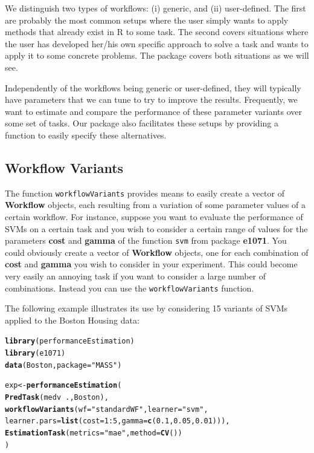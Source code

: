 \documentclass[10pt,a4paper]{article}\usepackage[]{graphicx}\usepackage[]{color}
\makeatletter
\newcommand{\hlnum}[1]{\textcolor[rgb]{0.686,0.059,0.569}{#1}}%
\newcommand{\hlstr}[1]{\textcolor[rgb]{0.192,0.494,0.8}{#1}}%
\newcommand{\hlopt}[1]{\textcolor[rgb]{0,0,0}{#1}}%
\newcommand{\hlstd}[1]{\textcolor[rgb]{0.345,0.345,0.345}{#1}}%
\newcommand{\hlkwb}[1]{\textcolor[rgb]{0.69,0.353,0.396}{#1}}%
\newcommand{\hlkwc}[1]{\textcolor[rgb]{0.333,0.667,0.333}{#1}}%
\newcommand{\hlkwd}[1]{\textcolor[rgb]{0.737,0.353,0.396}{\textbf{#1}}}%
\newenvironment{kframe}{%
 \def\at@end@of@kframe{}%
 \ifinner\ifhmode%
  \def\at@end@of@kframe{\end{minipage}}%
  \begin{minipage}{\columnwidth}%
 \fi\fi%
 \def\FrameCommand##1{\hskip\@totalleftmargin \hskip-\fboxsep
 \colorbox{shadecolor}{##1}\hskip-\fboxsep
     \hskip-\linewidth \hskip-\@totalleftmargin \hskip\columnwidth}%
 \MakeFramed {\advance\hsize-\width
   \@totalleftmargin\z@ \linewidth\hsize
   \@setminipage}}%
 {\par\unskip\endMakeFramed%
 \at@end@of@kframe}
\newenvironment{knitrout}{}{} %
\makeatother
\begin{document}
We distinguish two types of workflows: (i) generic, and (ii) user-defined. The first are probably the most common setups where the user simply wants to apply methods that already exist in R to some task. The second covers situations where the user has developed her/his own specific approach to solve a task and wants to apply it to some concrete problems. The package covers both situations as we will see.

Independently of the workflows being generic or user-defined, they will typically have parameters that we can tune to try to improve the results. Frequently, we want to estimate and compare the performance of these parameter variants over some set of tasks. Our package also facilitates these setups by providing a function to easily specify these alternatives.

\subsection{Workflow Variants}\label{sec:variants}

The function \texttt{workflowVariants}  provides  means to easily create a vector of \textbf{Workflow} objects, each resulting from a variation of some parameter values of a certain workflow. For instance, suppose you want to evaluate the performance of SVMs on a certain task and you wish to consider a certain range of values for the parameters \textbf{cost} and \textbf{gamma} of the function \texttt{svm} from package \textbf{e1071}. You could obviously create a vector of \textbf{Workflow} objects, one for each combination of \textbf{cost} and \textbf{gamma} you wish to consider in your experiment. This could become very easily an annoying task if you want to consider a large number of combinations. Instead you can use the \texttt{workflowVariants} function.

The following example illustrates its use by considering 15 variants of SVMs applied to the Boston Housing data:


\begin{knitrout}\footnotesize
{}\color{fgcolor}\begin{kframe}
\begin{alltt}
\hlkwd{library}\hlstd{(performanceEstimation)}
\hlkwd{library}\hlstd{(e1071)}
\hlkwd{data}\hlstd{(Boston,}\hlkwc{package}\hlstd{=}\hlstr{"MASS"}\hlstd{)}

\hlstd{exp} \hlkwb{<-} \hlkwd{performanceEstimation}\hlstd{(}
         \hlkwd{PredTask}\hlstd{(medv} \hlopt{~} \hlstd{.,Boston),}
         \hlkwd{workflowVariants}\hlstd{(}\hlkwc{wf}\hlstd{=}\hlstr{"standardWF"}\hlstd{,}\hlkwc{learner}\hlstd{=}\hlstr{"svm"}\hlstd{,}
                          \hlkwc{learner.pars}\hlstd{=}\hlkwd{list}\hlstd{(}\hlkwc{cost}\hlstd{=}\hlnum{1}\hlopt{:}\hlnum{5}\hlstd{,}\hlkwc{gamma}\hlstd{=}\hlkwd{c}\hlstd{(}\hlnum{0.1}\hlstd{,}\hlnum{0.05}\hlstd{,}\hlnum{0.01}\hlstd{))),}
         \hlkwd{EstimationTask}\hlstd{(}\hlkwc{metrics}\hlstd{=}\hlstr{"mae"}\hlstd{,}\hlkwc{method}\hlstd{=}\hlkwd{CV}\hlstd{())}
         \hlstd{)}
\end{alltt}
\end{kframe}
\end{knitrout}
\end{document}
